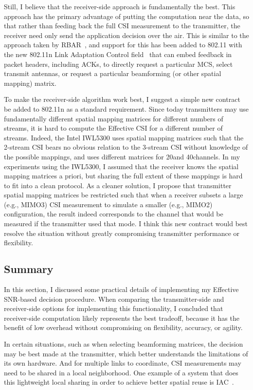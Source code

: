 Still, I believe that the receiver-side approach is fundamentally the best. This approach has the primary advantage of putting the computation near the data, so that rather than feeding back the full CSI measurement to the transmitter, the receiver need only send the application decision over the air. This is similar to the approach taken by RBAR~\cite{Holland_RBAR}, and support for this has been added to 802.11 with the new 802.11n Link Adaptation Control field~\cite[\S7.1.3.5a]{80211n} that can embed feedback in packet headers, including ACKs, to directly request a particular MCS, select transmit antennas, or request a particular beamforming (or other spatial mapping) matrix.

To make the receiver-side algorithm work best, I suggest a simple new contract be added to 802.11n as a standard requirement. Since today transmitters may use fundamentally different spatial mapping matrices for different numbers of streams, it is hard to compute the Effective CSI for a different number of streams. Indeed, the Intel IWL5300 uses spatial mapping matrices such that the 2-stream CSI bears no obvious relation to the 3-stream CSI without knowledge of the possible mappings, and uses different matrices for 20\MHz and 40\MHz channels. In my experiments using the IWL5300, I assumed that the receiver knows the spatial mapping matrices a priori, but sharing the full extent of these mappings is hard to fit into a clean protocol. As a cleaner solution, I propose that transmitter spatial mapping matrices be restricted such that when a receiver subsets a large (e.g., MIMO3) CSI measurement to simulate a smaller (e.g., MIMO2) configuration, the result indeed corresponds to the channel that would be measured if the transmitter used that mode. I think this new contract would best resolve the situation without greatly compromising transmitter performance or flexibility.

\subsection{Summary}
In this section, I discussed some practical details of implementing my Effective SNR-based decision procedure. When comparing the transmitter-side and receiver-side options for implementing this functionality, I concluded that receiver-side computation likely represents the best tradeoff, because it has the benefit of low overhead without compromising on flexibility, accuracy, or agility.

In certain situations, such as when selecting beamforming matrices, the decision may be best made at the transmitter, which better understands the limitations of its own hardware. And for multiple links to coordinate, CSI measurements may need to be shared in a local neighborhood. One example of a system that does this lightweight local sharing in order to achieve better spatial reuse is IAC~\cite{Gollakota_IAC}.

